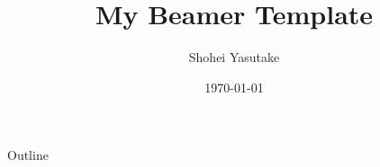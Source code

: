 \documentclass[12pt,dvipdfmx]{beamer}
\title{My Beamer Template}
\author{Shohei Yasutake}
\institute{Tokyo Institute of Technology}
\date{\today}
\begin{document}
\maketitle

\begin{frame}{Outline}
  \tableofcontents
\end{frame}


\end{document}
